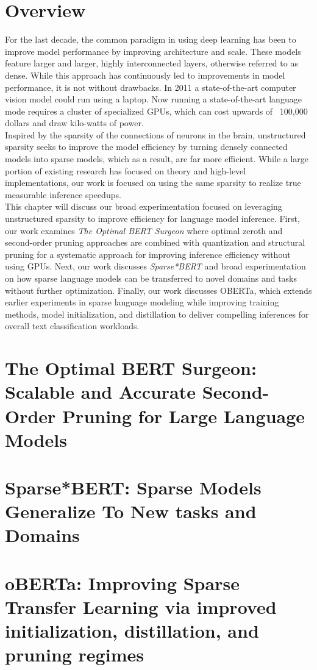\section{Overview}
For the last decade, the common paradigm in using deep learning has been to improve model performance by improving architecture and scale. These models feature larger and larger, highly interconnected layers, otherwise referred to as dense. While this approach has continuously led to improvements in model performance, it is not without drawbacks. In 2011 a state-of-the-art computer vision model could run using a laptop. Now running a state-of-the-art language mode requires a cluster of specialized GPUs, which can cost upwards of \ 100,000 dollars and draw kilo-watts of power. \\
Inspired by the sparsity of the connections of neurons in the brain, unstructured sparsity seeks to improve the model efficiency by turning densely connected models into sparse models, which as a result, are far more efficient. While a large portion of existing research has focused on theory and high-level implementations, our work is focused on using the same sparsity to realize true measurable inference speedups. \\
This chapter will discuss our broad experimentation focused on leveraging unstructured sparsity to improve efficiency for language model inference. First, our work examines \textit{The Optimal BERT Surgeon} where optimal zeroth and second-order pruning approaches are combined with quantization and structural pruning for a systematic approach for improving inference efficiency without using GPUs. Next, our work discusses \textit{Sparse*BERT} and broad experimentation on how sparse language models can be transferred to novel domains and tasks without further optimization. Finally, our work discusses OBERTa, which extends earlier experiments in sparse language modeling while improving training methods, model initialization, and distillation to deliver compelling inferences for overall text classification workloads. 
\section{The Optimal BERT Surgeon: Scalable and Accurate Second-Order Pruning for Large Language Models}
 
\section{Sparse*BERT: Sparse Models Generalize To New tasks and Domains}

\section{oBERTa: Improving Sparse Transfer Learning via improved initialization, distillation, and pruning regimes}
\section{}
